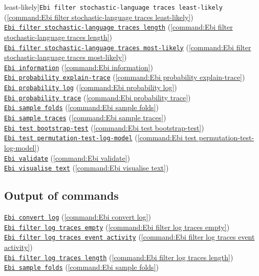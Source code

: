 {least-likely]{\texttt{Ebi filter stochastic-language traces least-likely}} (\cref{command:Ebi filter stochastic-language traces least-likely})\\\null\qquad\hyperref[command:Ebi filter stochastic-language traces length]{\texttt{Ebi filter stochastic-language traces length}} (\cref{command:Ebi filter stochastic-language traces length})\\\null\qquad\hyperref[command:Ebi filter stochastic-language traces most-likely]{\texttt{Ebi filter stochastic-language traces most-likely}} (\cref{command:Ebi filter stochastic-language traces most-likely})\\\null\qquad\hyperref[command:Ebi information]{\texttt{Ebi information}} (\cref{command:Ebi information})\\\null\qquad\hyperref[command:Ebi probability explain-trace]{\texttt{Ebi probability explain-trace}} (\cref{command:Ebi probability explain-trace})\\\null\qquad\hyperref[command:Ebi probability log]{\texttt{Ebi probability log}} (\cref{command:Ebi probability log})\\\null\qquad\hyperref[command:Ebi probability trace]{\texttt{Ebi probability trace}} (\cref{command:Ebi probability trace})\\\null\qquad\hyperref[command:Ebi sample folds]{\texttt{Ebi sample folds}} (\cref{command:Ebi sample folds})\\\null\qquad\hyperref[command:Ebi sample traces]{\texttt{Ebi sample traces}} (\cref{command:Ebi sample traces})\\\null\qquad\hyperref[command:Ebi test bootstrap-test]{\texttt{Ebi test bootstrap-test}} (\cref{command:Ebi test bootstrap-test})\\\null\qquad\hyperref[command:Ebi test permutation-test-log-model]{\texttt{Ebi test permutation-test-log-model}} (\cref{command:Ebi test permutation-test-log-model})\\\null\qquad\hyperref[command:Ebi validate]{\texttt{Ebi validate}} (\cref{command:Ebi validate})\\\null\qquad\hyperref[command:Ebi visualise text]{\texttt{Ebi visualise text}} (\cref{command:Ebi visualise text})
\subsection*{Output of commands} \null\qquad\hyperref[command:Ebi convert log]{\texttt{Ebi convert log}} (\cref{command:Ebi convert log})\\\null\qquad\hyperref[command:Ebi filter log traces empty]{\texttt{Ebi filter log traces empty}} (\cref{command:Ebi filter log traces empty})\\\null\qquad\hyperref[command:Ebi filter log traces event activity]{\texttt{Ebi filter log traces event activity}} (\cref{command:Ebi filter log traces event activity})\\\null\qquad\hyperref[command:Ebi filter log traces length]{\texttt{Ebi filter log traces length}} (\cref{command:Ebi filter log traces length})\\\null\qquad\hyperref[command:Ebi sample folds]{\texttt{Ebi sample folds}} (\cref{command:Ebi sample folds})
}
